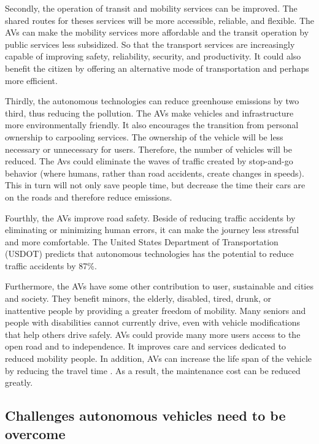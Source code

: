 Secondly, the operation of transit and mobility services can be improved. The shared routes for theses services will be more accessible, reliable, and flexible. The AVs can make the mobility services more affordable and the transit operation by public services less subsidized. So that the transport services are increasingly capable of improving safety, reliability, security, and productivity. It could also benefit the citizen by offering an alternative mode of transportation and perhaps more efficient.\smallskip

Thirdly, the autonomous technologies can reduce greenhouse emissions by two third, thus reducing the pollution. The AVs make vehicles and infrastructure more environmentally friendly. It also encourages the transition from personal ownership to carpooling services. The ownership of the vehicle will be less necessary or unnecessary for users. Therefore, the number of vehicles will be reduced. The Avs could eliminate the waves of traffic created by stop-and-go behavior (where humans, rather than road accidents, create changes in speeds). This in turn will not only save people time, but decrease the time their cars are on the roads and therefore reduce emissions. \smallskip

Fourthly,  the AVs improve road safety. Beside of reducing traffic accidents by eliminating or minimizing human errors, it can make the journey less stressful and more comfortable. The United States Department of Transportation (USDOT) predicts that autonomous technologies has the potential to reduce traffic accidents by 87\%. \smallskip

Furthermore, the AVs have some other contribution to user, sustainable and cities and society. They benefit minors, the elderly, disabled, tired, drunk, or inattentive people by providing a greater freedom of mobility. Many seniors and people with disabilities cannot currently drive, even with vehicle modifications that help others drive safely. AVs could provide many more users access to the open road and to independence. It improves care and services dedicated to reduced mobility people. In addition, AVs can increase the life span of the vehicle by reducing the travel time . As a result, the maintenance cost can be reduced greatly.



\subsection{Challenges autonomous vehicles need to be overcome }

